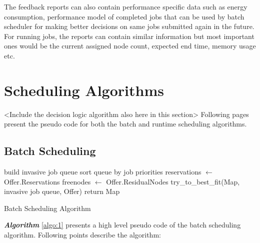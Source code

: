 The feedback reports can also contain performance specific data such as energy consumption, performance model of completed jobs that can be used by batch scheduler for making better decisions on same jobs submitted again in the future. For running jobs, the reports can contain similar information but most important ones would be the current assigned node count, expected end time, memory usage etc.
\section{Scheduling Algorithms}
<Include the decision logic algorithm also here in this section>
Following pages present the pseudo code for both the batch and runtime scheduling algorithms. 
\subsection{Batch Scheduling}
\IncMargin{1em}
\begin{algorithm}[!htbp]
 \DontPrintSemicolon
 build invasive job queue\;
 sort queue by job priorities\;
 reservations $\leftarrow$ Offer.Reservations\;
 freenodes $\leftarrow$ Offer.ResidualNodes\;
 try\_to\_best\_fit(Map, invasive job queue, Offer)\;
 return Map\;
 \caption{Batch Scheduling Algorithm}
 \label{algo:1}
\end{algorithm}
\textbf{\textit{Algorithm }}\ref{algo:1} presents a high level pseudo code of the batch scheduling algorithm. Following points describe the algorithm:
